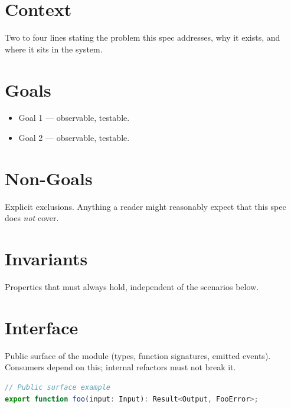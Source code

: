 




\makespecheader

\section{Context}
Two to four lines stating the problem this spec addresses, why it exists, and where it sits in the system.

\section{Goals}
\begin{itemize}[leftmargin=1.2em]
  \item Goal 1 --- observable, testable.
  \item Goal 2 --- observable, testable.
\end{itemize}

\section{Non-Goals}
\begin{nongoal}
Explicit exclusions. Anything a reader might reasonably expect that this spec does \emph{not} cover.
\end{nongoal}

\section{Invariants}
\begin{invariant}
Properties that must always hold, independent of the scenarios below.
\end{invariant}

\section{Interface}
Public surface of the module (types, function signatures, emitted events). Consumers depend on this; internal refactors must not break it.

\begin{lstlisting}[language=TypeScript]
// Public surface example
export function foo(input: Input): Result<Output, FooError>;
\end{lstlisting}

